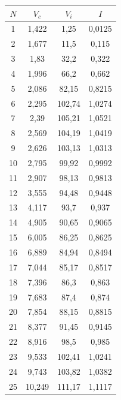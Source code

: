 \documentclass[12pt]{article}
\begin{document}
\begin{figure}[h!]
\begin{minipage}[h]{0.49\linewidth}
          \begin{tabular}{ | c | c | c | c | }
            \hline
            $N$ & $V_c$ & $V_i$ & $I$ \\ \hline
            1 & 1,422 & 1,25 & 0,0125 \\
            2 & 1,677 & 11,5 & 0,115 \\
            3 & 1,83 & 32,2 & 0,322 \\
            4 & 1,996 & 66,2 & 0,662 \\
            5 & 2,086 & 82,15 & 0,8215 \\
            6 & 2,295 & 102,74 & 1,0274 \\
            7 & 2,39 & 105,21 & 1,0521 \\
            8 & 2,569 & 104,19 & 1,0419 \\
            9 & 2,626 & 103,13 & 1,0313 \\
            10 & 2,795 & 99,92 & 0,9992 \\
            11 & 2,907 & 98,13 & 0,9813 \\
            12 & 3,555 & 94,48 & 0,9448 \\
            13 & 4,117 & 93,7 & 0,937 \\
            14 & 4,905 & 90,65 & 0,9065 \\
            15 & 6,005 & 86,25 & 0,8625 \\
            16 & 6,889 & 84,94 & 0,8494 \\
            17 & 7,044 & 85,17 & 0,8517 \\
            18 & 7,396 & 86,3 & 0,863 \\
            19 & 7,683 & 87,4 & 0,874 \\
            20 & 7,854 & 88,15 & 0,8815 \\
            21 & 8,377 & 91,45 & 0,9145 \\
            22 & 8,916 & 98,5 & 0,985 \\
            23 & 9,533 & 102,41 & 1,0241 \\
            24 & 9,743 & 103,82 & 1,0382 \\
            25 & 10,249 & 111,17 & 1,1117 \\
            \hline
          \end{tabular}

          \vspace{2.52cm}
        \end{minipage}
        \label{table:static_method}
      \end{figure}
\end{document}
